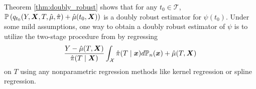 Theorem \ref{thm:doubly_robust} shows that for any $t_0\in\mathcal{T}$, $\mathbb{P}\left(q_{t_{0}}(Y,\boldsymbol{X},T,\hat\mu,\hat\pi)+\hat{\mu}(t_0,\boldsymbol{X})\right)$
is a doubly robust estimator for $\psi(t_0)$. Under some mild assumptions, one way to obtain a doubly robust estimator of $\psi$ is to utilize the two-stage procedure from \cite{kennedy2017non} by regressing 
\begin{equation}\label{eq:clever_response}
    \frac{Y-\hat \mu(T,\boldsymbol{X})}{\hat\pi(T\mid\boldsymbol{X})}\int_{\mathcal{X}}\hat\pi(T\mid\boldsymbol{x})d\mathbb{P}_n(\boldsymbol{x})+\hat \mu(T,\boldsymbol{X})
\end{equation} 
on $T$ using any nonparametric regression methods like kernel regression or spline regression.




